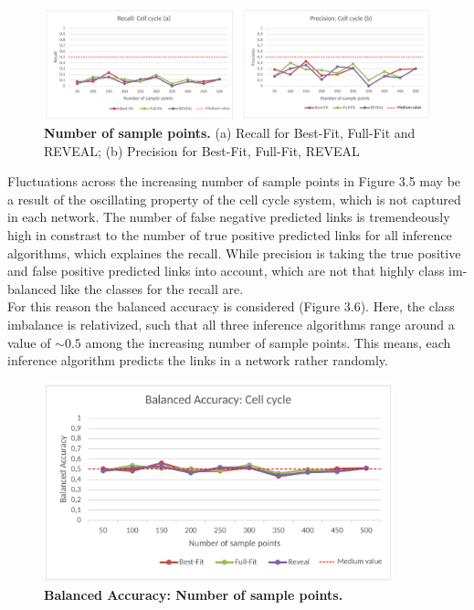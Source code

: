 \begin{figure}[H]
\captionsetup{width=0.9\linewidth}
\centering
\includegraphics[width=1.0\textwidth]{./Bilder/Scoring/insilico/2_cellcycle_measurements/RecPrec.pdf}
\caption[Precision and Recall: Number of sample points]{\textbf{Number of sample points.} (a) Recall for Best-Fit, Full-Fit and REVEAL; (b) Precision for Best-Fit, Full-Fit, REVEAL}
\label{fig:}
\end{figure}
\newpage
Fluctuations across the increasing number of sample points in Figure 3.5 may be a result of the oscillating property of the cell cycle system, which is not captured in each network. The number of false negative predicted links is tremendeously high in constrast to the number of true positive predicted links for all inference algorithms, which explaines the recall. While precision is taking the true positive and false positive predicted links into account, which are not that highly class im-balanced like the classes for the recall are.\\

For this reason the balanced accuracy is considered (Figure 3.6). Here, the class imbalance is relativized, such that all three inference algorithms range around a value of $\sim 0.5$ among the increasing number of sample points. This means, each inference algorithm predicts the links in a network rather randomly. 

\begin{figure}[H]
\captionsetup{width=0.9\linewidth}
\centering
\includegraphics[width=0.9\textwidth]{./Bilder/Scoring/insilico/2_cellcycle_measurements/Bacc.pdf}
\caption[Balanced Accuracy: Number of sample points]{\textbf{Balanced Accuracy: Number of sample points.}}
\label{fig:}
\end{figure}

